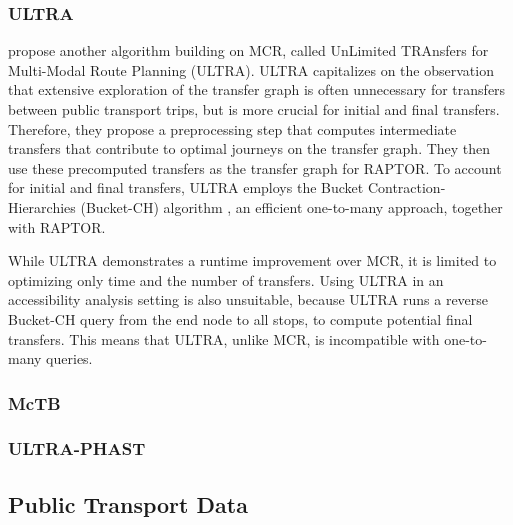 \subsubsection{ULTRA}
\label{subsubsec:ultra}

\cite{baumUnLimitedTRAnsfersMultiModal2019} propose another algorithm building on MCR, called UnLimited TRAnsfers for Multi-Modal Route Planning (ULTRA).
ULTRA capitalizes on the observation that extensive exploration of the transfer graph is often unnecessary for transfers between public transport trips, but is more crucial for initial and final transfers.
Therefore, they propose a preprocessing step that computes intermediate transfers that contribute to optimal journeys on the transfer graph.
They then use these precomputed transfers as the transfer graph for RAPTOR.
To account for initial and final transfers, ULTRA employs the Bucket Contraction-Hierarchies (Bucket-CH) algorithm \cite{geisbergerContractionHierarchiesFaster2008}, an efficient one-to-many approach, together with RAPTOR.

While ULTRA demonstrates a runtime improvement over MCR, it is limited to optimizing only time and the number of transfers.
Using ULTRA in an accessibility analysis setting is also unsuitable, because ULTRA runs a reverse Bucket-CH query from the end node to all stops, to compute potential final transfers.
This means that ULTRA, unlike MCR, is incompatible with one-to-many queries.

\subsubsection{McTB}
\label{subsubsec:mctb}

\cite{potthoffFastMultimodalJourney2021}

\subsubsection{ULTRA-PHAST}
\label{subsubsec:ultra-phast}



\subsection{Public Transport Data}
\label{subsec:public_transport_data}

